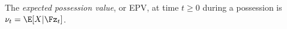 \documentclass[EPV_JASA.tex]{subfiles}
\begin{document}


\begin{definition}
    The \textit{expected possession value}, or EPV, at time $t \geq 0$ during a possession is $\nu_t = \E[X|\Fz_t]$.
\end{definition}

\end{document}

